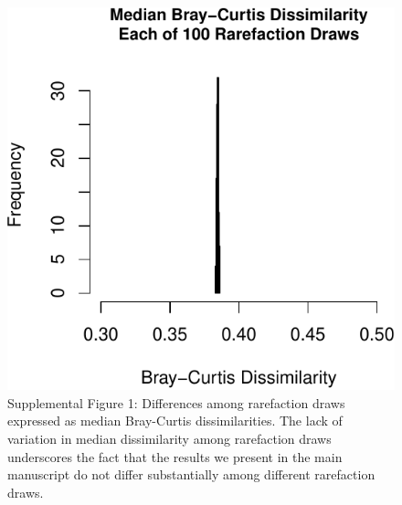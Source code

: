 \documentclass[fleqn,10pt,lineno]{wlpeerj} %
\begin{document}
\begin{figure}[!ht]

{\centering \includegraphics{figures/Supplement_Rarefaction_data-1} 

}

\caption*{\label{fig:SuppFig1} Supplemental Figure 1: Differences among rarefaction draws expressed as median Bray-Curtis dissimilarities. The lack of variation in median dissimilarity among rarefaction draws underscores the fact that the results we present in the main manuscript do not differ substantially among different rarefaction draws.}\label{fig:Supplement_Rarefaction_data}
\end{figure}
\end{document}
